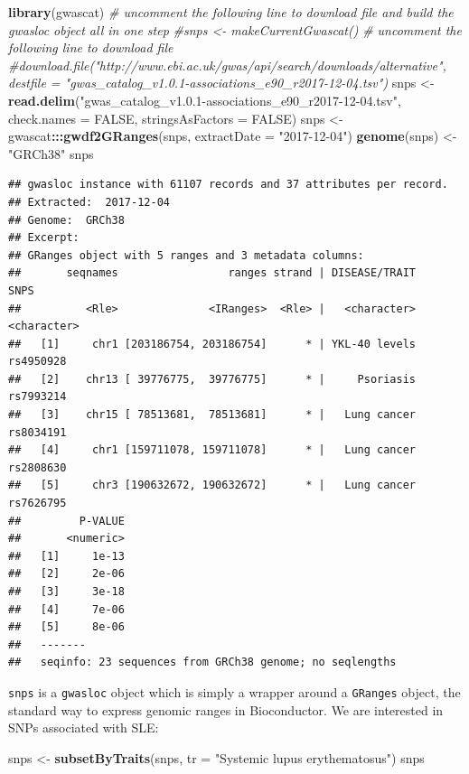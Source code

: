 \documentclass[9pt,a4paper,]{extarticle}
\newenvironment{Shaded}{\begin{snugshade}}{\end{snugshade}}
\newcommand{\KeywordTok}[1]{\textcolor[rgb]{0.13,0.29,0.53}{\textbf{#1}}}
\newcommand{\DataTypeTok}[1]{\textcolor[rgb]{0.13,0.29,0.53}{#1}}
\newcommand{\StringTok}[1]{\textcolor[rgb]{0.31,0.60,0.02}{#1}}
\newcommand{\CommentTok}[1]{\textcolor[rgb]{0.56,0.35,0.01}{\textit{#1}}}
\newcommand{\OtherTok}[1]{\textcolor[rgb]{0.56,0.35,0.01}{#1}}
\newcommand{\OperatorTok}[1]{\textcolor[rgb]{0.81,0.36,0.00}{\textbf{#1}}}
\newcommand{\NormalTok}[1]{#1}
\begin{document}
\begin{Shaded}
\begin{Highlighting}[]
\KeywordTok{library}\NormalTok{(gwascat)}
\CommentTok{# uncomment the following line to download file and build the gwasloc object all in one step}
\CommentTok{#snps <- makeCurrentGwascat()}
\CommentTok{# uncomment the following line to download file}
\CommentTok{#download.file("http://www.ebi.ac.uk/gwas/api/search/downloads/alternative", destfile = "gwas_catalog_v1.0.1-associations_e90_r2017-12-04.tsv")}
\NormalTok{snps <-}\StringTok{ }\KeywordTok{read.delim}\NormalTok{(}\StringTok{"gwas_catalog_v1.0.1-associations_e90_r2017-12-04.tsv"}\NormalTok{, }\DataTypeTok{check.names =} \OtherTok{FALSE}\NormalTok{, }\DataTypeTok{stringsAsFactors =} \OtherTok{FALSE}\NormalTok{)}
\NormalTok{snps <-}\StringTok{ }\NormalTok{gwascat}\OperatorTok{:::}\KeywordTok{gwdf2GRanges}\NormalTok{(snps, }\DataTypeTok{extractDate =} \StringTok{"2017-12-04"}\NormalTok{)}
\KeywordTok{genome}\NormalTok{(snps) <-}\StringTok{ "GRCh38"}
\NormalTok{snps}
\end{Highlighting}
\end{Shaded}

\begin{verbatim}
## gwasloc instance with 61107 records and 37 attributes per record.
## Extracted:  2017-12-04 
## Genome:  GRCh38 
## Excerpt:
## GRanges object with 5 ranges and 3 metadata columns:
##       seqnames                 ranges strand | DISEASE/TRAIT        SNPS
##          <Rle>              <IRanges>  <Rle> |   <character> <character>
##   [1]     chr1 [203186754, 203186754]      * | YKL-40 levels   rs4950928
##   [2]    chr13 [ 39776775,  39776775]      * |     Psoriasis   rs7993214
##   [3]    chr15 [ 78513681,  78513681]      * |   Lung cancer   rs8034191
##   [4]     chr1 [159711078, 159711078]      * |   Lung cancer   rs2808630
##   [5]     chr3 [190632672, 190632672]      * |   Lung cancer   rs7626795
##         P-VALUE
##       <numeric>
##   [1]     1e-13
##   [2]     2e-06
##   [3]     3e-18
##   [4]     7e-06
##   [5]     8e-06
##   -------
##   seqinfo: 23 sequences from GRCh38 genome; no seqlengths
\end{verbatim}

\texttt{snps} is a \texttt{gwasloc} object which is simply a wrapper around a \texttt{GRanges} object, the standard way to express genomic ranges in Bioconductor.
We are interested in SNPs associated with SLE:

\begin{Shaded}
\begin{Highlighting}[]
\NormalTok{snps <-}\StringTok{ }\KeywordTok{subsetByTraits}\NormalTok{(snps, }\DataTypeTok{tr =} \StringTok{"Systemic lupus erythematosus"}\NormalTok{)}
\NormalTok{snps}
\end{Highlighting}
\end{Shaded}
\end{document}
